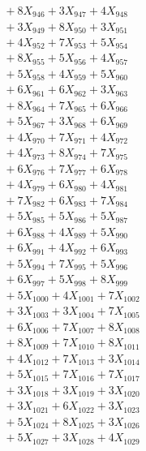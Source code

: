 \documentclass[a4paper,10pt]{article}
\begin{document}
{\begin{align}
&\;  + 8 X_{946} + 3 X_{947} + 4 X_{948} \\[0.3ex]
&\;  + 3 X_{949} + 8 X_{950} + 3 X_{951} \\[0.3ex]
&\;  + 4 X_{952} + 7 X_{953} + 5 X_{954} \\[0.3ex]
&\;  + 8 X_{955} + 5 X_{956} + 4 X_{957} \\[0.3ex]
&\;  + 5 X_{958} + 4 X_{959} + 5 X_{960} \\[0.3ex]
&\;  + 6 X_{961} + 6 X_{962} + 3 X_{963} \\[0.3ex]
&\;  + 8 X_{964} + 7 X_{965} + 6 X_{966} \\[0.3ex]
&\;  + 5 X_{967} + 3 X_{968} + 6 X_{969} \\[0.5ex]\allowbreak
&\;  + 4 X_{970} + 7 X_{971} + 4 X_{972} \\[0.3ex]
&\;  + 4 X_{973} + 8 X_{974} + 7 X_{975} \\[0.3ex]
&\;  + 6 X_{976} + 7 X_{977} + 6 X_{978} \\[0.3ex]
&\;  + 4 X_{979} + 6 X_{980} + 4 X_{981} \\[0.3ex]
&\;  + 7 X_{982} + 6 X_{983} + 7 X_{984} \\[0.3ex]
&\;  + 5 X_{985} + 5 X_{986} + 5 X_{987} \\[0.3ex]
&\;  + 6 X_{988} + 4 X_{989} + 5 X_{990} \\[0.3ex]
&\;  + 6 X_{991} + 4 X_{992} + 6 X_{993} \\[0.3ex]
&\;  + 5 X_{994} + 7 X_{995} + 5 X_{996} \\[0.3ex]
&\;  + 6 X_{997} + 5 X_{998} + 8 X_{999} \\[0.5ex]\allowbreak
&\;  + 5 X_{1000} + 4 X_{1001} + 7 X_{1002} \\[0.3ex]
&\;  + 3 X_{1003} + 3 X_{1004} + 7 X_{1005} \\[0.3ex]
&\;  + 6 X_{1006} + 7 X_{1007} + 8 X_{1008} \\[0.3ex]
&\;  + 8 X_{1009} + 7 X_{1010} + 8 X_{1011} \\[0.3ex]
&\;  + 4 X_{1012} + 7 X_{1013} + 3 X_{1014} \\[0.3ex]
&\;  + 5 X_{1015} + 7 X_{1016} + 7 X_{1017} \\[0.3ex]
&\;  + 3 X_{1018} + 3 X_{1019} + 3 X_{1020} \\[0.3ex]
&\;  + 3 X_{1021} + 6 X_{1022} + 3 X_{1023} \\[0.3ex]
&\;  + 5 X_{1024} + 8 X_{1025} + 3 X_{1026} \\[0.3ex]
&\;  + 5 X_{1027} + 3 X_{1028} + 4 X_{1029} \\[0.5ex]\allowbreak

\end{align}}
\end{document}
